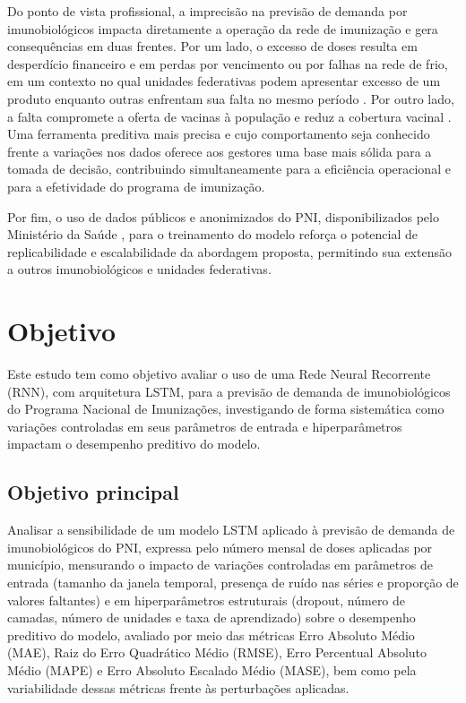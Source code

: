 \documentclass[
    12pt,                %
    openright,           %
    oneside,             %
    a4paper,             %
    english,             %
    brazil               %
]{abntex2}
\begin{document}
Do ponto de vista profissional, a imprecisão na previsão de demanda por imunobiológicos impacta diretamente a operação da rede de imunização e gera consequências em duas frentes. Por um lado, o excesso de doses resulta em desperdício financeiro e em perdas por vencimento ou por falhas na rede de frio, em um contexto no qual unidades federativas podem apresentar excesso de um produto enquanto outras enfrentam sua falta no mesmo período \cite{Lopes2022}. Por outro lado, a falta compromete a oferta de vacinas à população e reduz a cobertura vacinal \cite{Hariharan2020}. Uma ferramenta preditiva mais precisa e cujo comportamento seja conhecido frente a variações nos dados oferece aos gestores uma base mais sólida para a tomada de decisão, contribuindo simultaneamente para a eficiência operacional e para a efetividade do programa de imunização.

Por fim, o uso de dados públicos e anonimizados do PNI, disponibilizados pelo Ministério da Saúde \cite{BrasilPNIDados}, para o treinamento do modelo reforça o potencial de replicabilidade e escalabilidade da abordagem proposta, permitindo sua extensão a outros imunobiológicos e unidades federativas.

\section{Objetivo}
\label{sec:objetivo}

Este estudo tem como objetivo avaliar o uso de uma Rede Neural Recorrente (RNN), com arquitetura LSTM, para a previsão de demanda de imunobiológicos do Programa Nacional de Imunizações, investigando de forma sistemática como variações controladas em seus parâmetros de entrada e hiperparâmetros impactam o desempenho preditivo do modelo.

\subsection{Objetivo principal}

Analisar a sensibilidade de um modelo LSTM aplicado à previsão de demanda de imunobiológicos do PNI, expressa pelo número mensal de doses aplicadas por município, mensurando o impacto de variações controladas em parâmetros de entrada (tamanho da janela temporal, presença de ruído nas séries e proporção de valores faltantes) e em hiperparâmetros estruturais (dropout, número de camadas, número de unidades e taxa de aprendizado) sobre o desempenho preditivo do modelo, avaliado por meio das métricas Erro Absoluto Médio (MAE), Raiz do Erro Quadrático Médio (RMSE), Erro Percentual Absoluto Médio (MAPE) e Erro Absoluto Escalado Médio (MASE), bem como pela variabilidade dessas métricas frente às perturbações aplicadas.
\end{document}
